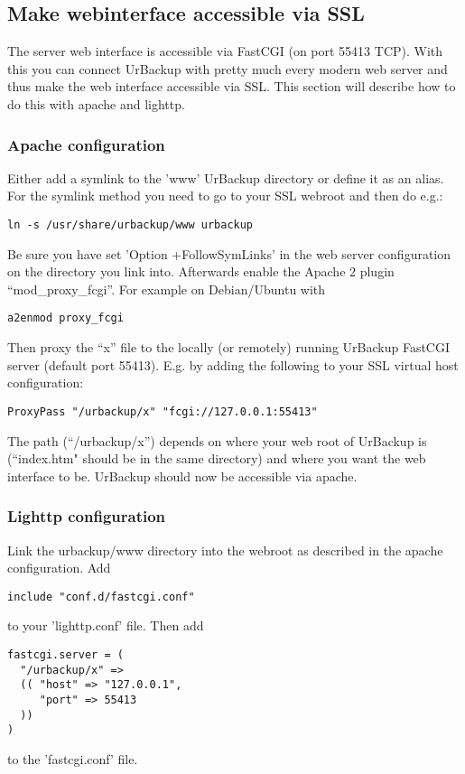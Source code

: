 \documentclass[a4paper,10pt]{article}
\begin{document}
\subsection{Make webinterface accessible via SSL}
\label{sec_webinterface_ssl}

The server web interface is accessible via FastCGI (on port 55413 TCP). With this you can connect UrBackup with pretty much every modern web server and thus make the web interface accessible via SSL. This section will describe how to do this with apache and lighttp.

\subsubsection{Apache configuration}
\label{subsub_apache}

Either add a symlink to the 'www' UrBackup directory or define it as an alias. 
For the symlink method you need to go to your SSL webroot and then do e.g.:
\begin{verbatim}
ln -s /usr/share/urbackup/www urbackup
\end{verbatim}
Be sure you have set 'Option +FollowSymLinks' in the web server configuration on the directory you link into. 
Afterwards enable the Apache $2$ plugin ``mod\_proxy\_fcgi''. For example on Debian/Ubuntu with
\begin{verbatim}
a2enmod proxy_fcgi
\end{verbatim}
Then proxy the ``x'' file to the locally (or remotely) running UrBackup FastCGI server (default port 55413).
E.g. by adding the following to your SSL virtual host configuration:
\begin{verbatim}
ProxyPass "/urbackup/x" "fcgi://127.0.0.1:55413"
\end{verbatim}
The path (``/urbackup/x'') depends on where your web root of UrBackup is (``index.htm" should be in the same directory)
and where you want the web interface to be. UrBackup should now be accessible via apache.

\subsubsection{Lighttp configuration}

Link the urbackup/www directory into the webroot as described in the apache configuration.
Add
\begin{verbatim}
include "conf.d/fastcgi.conf"
\end{verbatim}
to your 'lighttp.conf' file. Then add 
\begin{verbatim}
fastcgi.server = (
  "/urbackup/x" =>
  (( "host" => "127.0.0.1",
     "port" => 55413
  ))
)
\end{verbatim}
to the 'fastcgi.conf' file.
\end{document}
